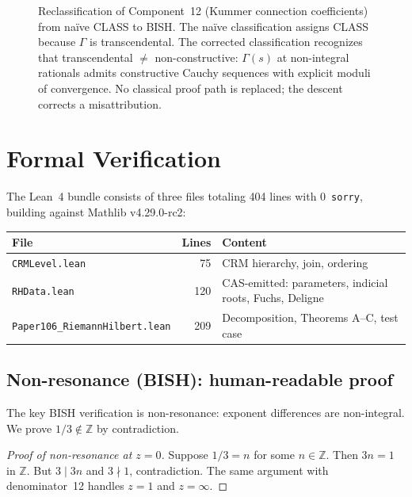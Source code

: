 \documentclass[11pt,a4paper]{article}
\theoremstyle{plain}
\theoremstyle{definition}
\newcommand{\BISH}{\textsf{BISH}}
\newcommand{\CLASS}{\textsf{CLASS}}
\newcommand{\Z}{\mathbb{Z}}
\begin{document}
\begin{figure}[ht]
\caption{Reclassification of Component~12 (Kummer connection coefficients) from na\"ive \CLASS{} to \BISH.
The na\"ive classification assigns \CLASS{} because $\Gamma$ is transcendental.
The corrected classification recognizes that transcendental $\neq$ non-constructive: $\Gamma(s)$ at non-integral rationals admits constructive Cauchy sequences with explicit moduli of convergence.
No classical proof path is replaced; the descent corrects a misattribution.}
\label{fig:reclassification}
\end{figure}

\section{Formal Verification}

The Lean~4 bundle consists of three files totaling 404 lines with 0~\texttt{sorry}, building against Mathlib v4.29.0-rc2:

\begin{center}
\begin{tabular}{lrl}
\toprule
File & Lines & Content \\
\midrule
\texttt{CRMLevel.lean} & 75 & CRM hierarchy, join, ordering \\
\texttt{RHData.lean} & 120 & CAS-emitted: parameters, indicial roots, Fuchs, Deligne \\
\texttt{Paper106\_RiemannHilbert.lean} & 209 & Decomposition, Theorems A--C, test case \\
\bottomrule
\end{tabular}
\end{center}

\subsection{Non-resonance (\BISH): human-readable proof}

The key \BISH{} verification is non-resonance: exponent differences are non-integral.
We prove $1/3 \notin \Z$ by contradiction.

\begin{proof}[Proof of non-resonance at $z = 0$]
Suppose $1/3 = n$ for some $n \in \Z$.
Then $3n = 1$ in $\Z$.
But $3 \mid 3n$ and $3 \nmid 1$, contradiction.
The same argument with denominator~12 handles $z = 1$ and $z = \infty$.
\end{proof}
\end{document}
